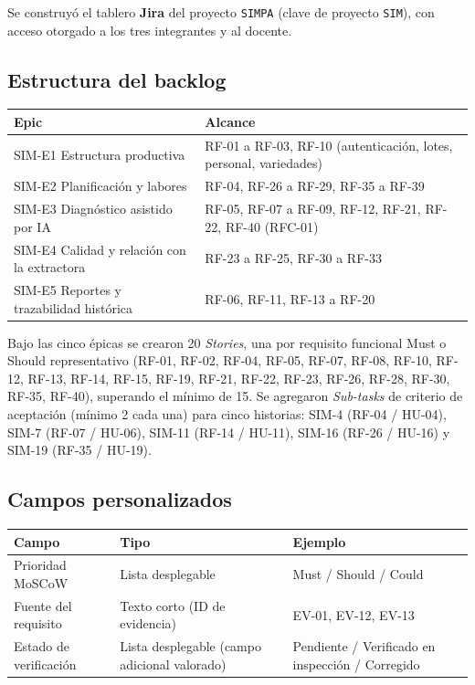\documentclass[11pt,a4paper]{article}
\begin{document}
Se construyó el tablero \textbf{Jira} del proyecto \texttt{SIMPA} (clave de proyecto
\texttt{SIM}), con acceso otorgado a los tres integrantes y al docente.

\subsection{Estructura del backlog}

\begin{center}
\begin{tabular}{p{3.2cm}p{9.5cm}}
\toprule
\textbf{Epic} & \textbf{Alcance} \\
\midrule
SIM-E1 Estructura productiva & RF-01 a RF-03, RF-10 (autenticación, lotes, personal, variedades) \\
SIM-E2 Planificación y labores & RF-04, RF-26 a RF-29, RF-35 a RF-39 \\
SIM-E3 Diagnóstico asistido por IA & RF-05, RF-07 a RF-09, RF-12, RF-21, RF-22, RF-40 (RFC-01) \\
SIM-E4 Calidad y relación con la extractora & RF-23 a RF-25, RF-30 a RF-33 \\
SIM-E5 Reportes y trazabilidad histórica & RF-06, RF-11, RF-13 a RF-20 \\
\bottomrule
\end{tabular}
\end{center}

\noindent Bajo las cinco épicas se crearon 20 \emph{Stories}, una por requisito funcional Must o
Should representativo (RF-01, RF-02, RF-04, RF-05, RF-07, RF-08, RF-10, RF-12, RF-13, RF-14,
RF-15, RF-19, RF-21, RF-22, RF-23, RF-26, RF-28, RF-30, RF-35, RF-40), superando el mínimo de 15.
Se agregaron \emph{Sub-tasks} de criterio de aceptación (mínimo 2 cada una) para cinco historias:
SIM-4 (RF-04 / HU-04), SIM-7 (RF-07 / HU-06), SIM-11 (RF-14 / HU-11), SIM-16 (RF-26 / HU-16) y
SIM-19 (RF-35 / HU-19).

\subsection{Campos personalizados}

\begin{center}
\begin{tabular}{lll}
\toprule
\textbf{Campo} & \textbf{Tipo} & \textbf{Ejemplo} \\
\midrule
Prioridad MoSCoW & Lista desplegable & Must / Should / Could \\
Fuente del requisito & Texto corto (ID de evidencia) & EV-01, EV-12, EV-13 \\
Estado de verificación & Lista desplegable (campo adicional valorado) & Pendiente / Verificado en inspección / Corregido \\
\bottomrule
\end{tabular}
\end{center}
\end{document}
